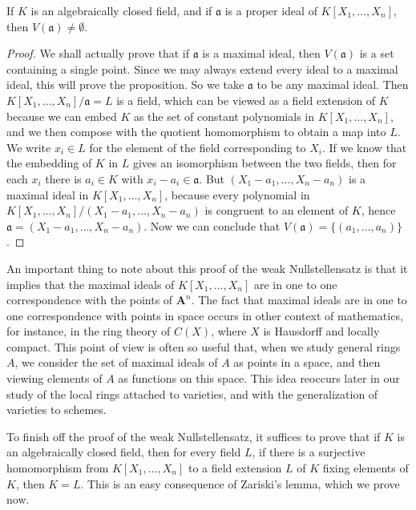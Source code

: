 \begin{lemma}
    If $K$ is an algebraically closed field, and if $\mathfrak{a}$ is a proper ideal of $K[X_1, \dots, X_n]$, then $V(\mathfrak{a}) \neq \emptyset$.
\end{lemma}
\begin{proof}
    We shall actually prove that if $\mathfrak{a}$ is a maximal ideal, then $V(\mathfrak{a})$ is a set containing a single point. Since we may always extend every ideal to a maximal ideal, this will prove the proposition. So we take $\mathfrak{a}$ to be any maximal ideal. Then $K[X_1, \dots, X_n]/\mathfrak{a} = L$ is a field, which can be viewed as a field extension of $K$ because we can embed $K$ as the set of constant polynomials in $K[X_1, \dots, X_n]$, and we then compose with the quotient homomorphism to obtain a map into $L$. We write $x_i \in L$ for the element of the field corresponding to $X_i$. If we know that the embedding of $K$ in $L$ gives an isomorphism between the two fields, then for each $x_i$ there is $a_i \in K$ with $x_i - a_i \in \mathfrak{a}$. But $(X_1 - a_1, \dots, X_n - a_n)$ is a maximal ideal in $K[X_1, \dots, X_n]$, because every polynomial in $K[X_1, \dots, X_n]/(X_1 - a_1, \dots, X_n - a_n)$ is congruent to an element of $K$, hence $\mathfrak{a} = (X_1 - a_1, \dots, X_n - a_n)$. Now we can conclude that $V(\mathfrak{a}) = \{ (a_1, \dots, a_n) \}$.
\end{proof}

An important thing to note about this proof of the weak Nullstellensatz is that it implies that the maximal ideals of $K[X_1, \dots, X_n]$ are in one to one correspondence with the points of $\mathbf{A}^n$. The fact that maximal ideals are in one to one correspondence with points in space occurs in other context of mathematics, for instance, in the ring theory of $C(X)$, where $X$ is Hausdorff and locally compact. This point of view is often so useful that, when we study general rings $A$, we consider the set of maximal ideals of $A$ as points in a space, and then viewing elements of $A$ as functions on this space. This idea reoccurs later in our study of the local rings attached to varieties, and with the generalization of varieties to schemes.

To finish off the proof of the weak Nullstellensatz, it suffices to prove that if $K$ is an algebraically closed field, then for every field $L$, if there is a surjective homomorphism from $K[X_1, \dots, X_n]$ to a field extension $L$ of $K$ fixing elements of $K$, then $K = L$. This is an easy consequence of Zariski's lemma, which we prove now.

